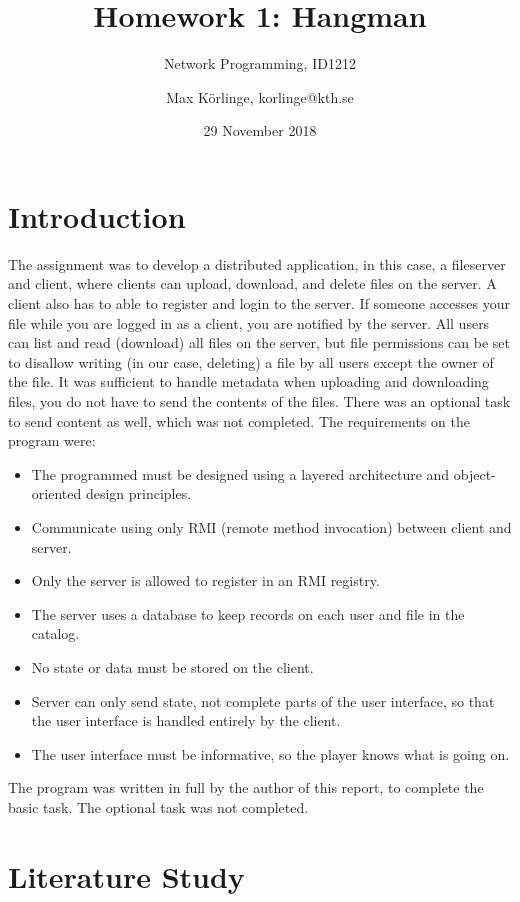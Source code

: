 \documentclass[a4paper]{scrartcl}
\title{Homework 1: Hangman}
\subtitle{Network Programming, ID1212}
\author{Max Körlinge, korlinge@kth.se}
\date{29 November 2018}
\begin{document}
\maketitle


\section{Introduction}

\noindent The assignment was to develop a distributed application, in this case, a fileserver and client, where clients can upload, download, and delete files on the server. A client also has to able to register and login to the server. If someone accesses your file while you are logged in as a client, you are notified by the server. All users can list and read (download) all files on the server, but file permissions can be set to disallow writing (in our case, deleting) a file by all users except the owner of the file. It was sufficient to handle metadata when uploading and downloading files, you do not have to send the contents of the files. There was an optional task to send content as well, which was not completed. The requirements on the program were:

\begin{itemize}
    \item The programmed must be designed using a layered architecture and object-oriented design principles.
    \item Communicate using only RMI (remote method invocation) between client and server.
    \item Only the server is allowed to register in an RMI registry.
    \item The server uses a database to keep records on each user and file in the catalog.
    \item No state or data must be stored on the client.
    \item Server can only send state, not complete parts of the user interface, so that the user interface is handled entirely by the client.
    \item The user interface must be informative, so the player knows what is going on.
\end{itemize}

The program was written in full by the author of this report, to complete the basic task. The optional task was not completed.

\section{Literature Study}
\end{document}

